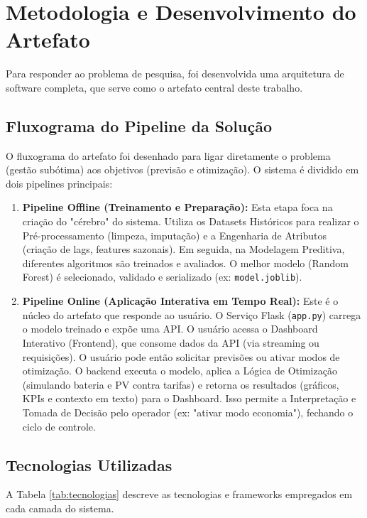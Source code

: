 \documentclass[conference]{IEEEtran}
\begin{document}
\section{Metodologia e Desenvolvimento do Artefato}

Para responder ao problema de pesquisa, foi desenvolvida uma arquitetura de software completa, que serve como o artefato central deste trabalho.

\subsection{Fluxograma do Pipeline da Solução}
O fluxograma do artefato foi desenhado para ligar diretamente o problema (gestão subótima) aos objetivos (previsão e otimização). O sistema é dividido em dois pipelines principais:

\begin{enumerate}
    \item \textbf{Pipeline Offline (Treinamento e Preparação):} Esta etapa foca na criação do "cérebro" do sistema. Utiliza os Datasets Históricos para realizar o Pré-processamento (limpeza, imputação) e a Engenharia de Atributos (criação de lags, features sazonais). Em seguida, na Modelagem Preditiva, diferentes algoritmos são treinados e avaliados. O melhor modelo (Random Forest) é selecionado, validado e serializado (ex: \texttt{model.joblib}).
    \item \textbf{Pipeline Online (Aplicação Interativa em Tempo Real):} Este é o núcleo do artefato que responde ao usuário. O Serviço Flask (\texttt{app.py}) carrega o modelo treinado e expõe uma API. O usuário acessa o Dashboard Interativo (Frontend), que consome dados da API (via streaming ou requisições). O usuário pode então solicitar previsões ou ativar modos de otimização. O backend executa o modelo, aplica a Lógica de Otimização (simulando bateria e PV contra tarifas) e retorna os resultados (gráficos, KPIs e contexto em texto) para o Dashboard. Isso permite a Interpretação e Tomada de Decisão pelo operador (ex: "ativar modo economia"), fechando o ciclo de controle.
\end{enumerate}

\subsection{Tecnologias Utilizadas}
A Tabela \ref{tab:tecnologias} descreve as tecnologias e frameworks empregados em cada camada do sistema.
\end{document}
